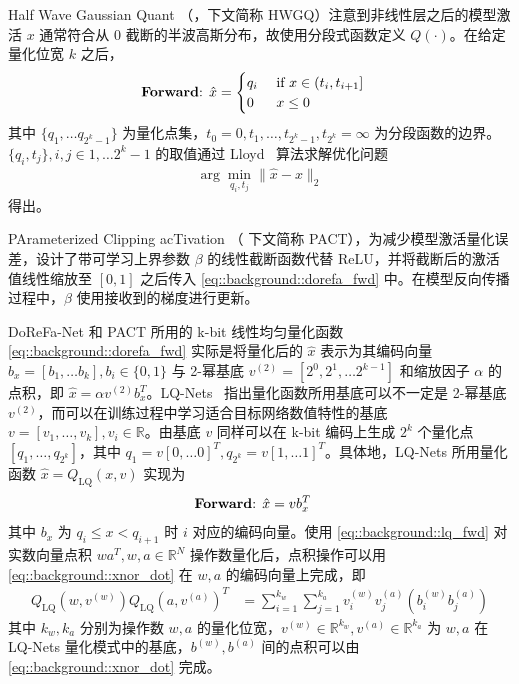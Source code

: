 Half Wave Gaussian Quant （\citet{cai2017deep}，下文简称 HWGQ）注意到非线性层之后的模型激活 $x$ 通常符合从 0 截断的半波高斯分布，故使用分段式函数定义 $Q(\cdot)$。在给定量化位宽 $k$ 之后，
\begin{align}
  \text{\textbf{Forward}: } & \hat{x} = 
    \begin{cases} 
      q_i & \text{ if } x \in (t_i, t_{i+1}] \\
      0 & \text{ } x \le 0
    \end{cases}
    \label{eq::background::hwgq}
\end{align}
其中 $\{q_1, \ldots q_{2^k-1}\}$ 为量化点集，$t_0=0, t_1, \ldots, t_{2^k-1}, t_{2^k}=\infty$ 为分段函数的边界。$\{q_i, t_j\}, i, j \in {1, \ldots 2^k-1}$ 的取值通过 Lloyd~\citep{lloyd1982least} 算法求解优化问题
\begin{align}
  \arg\min_{q_i, t_j} \|\hat{x} - x\|_2
\end{align}
得出。

PArameterized Clipping acTivation （\citet{choi2018pact} 下文简称 PACT），为减少模型激活量化误差，设计了带可学习上界参数 $\beta$ 的线性截断函数代替 ReLU，并将截断后的激活值线性缩放至 $[0, 1]$ 之后传入 \eqref{eq::background::dorefa_fwd} 中。在模型反向传播过程中，$\beta$ 使用接收到的梯度进行更新。 

DoReFa-Net 和 PACT 所用的 k-bit 线性均匀量化函数 \eqref{eq::background::dorefa_fwd} 实际是将量化后的 $\hat{x}$ 表示为其编码向量 $b_x = [b_1, \ldots b_k], b_i \in \{0, 1\}$ 与 2-幂基底 $v^{(2)} = [2^0, 2^1, \ldots 2^{k-1}]$ 和缩放因子 $\alpha$ 的点积，即 $\hat{x} = \alpha v^{(2)} b_x^T$。LQ-Nets~\citep{Zhang_2018} 指出量化函数所用基底可以不一定是 2-幂基底 $v^{(2)}$，而可以在训练过程中学习适合目标网络数值特性的基底 $v = [v_1, \ldots, v_k], v_i \in \mathbb{R}$。由基底 $v$ 同样可以在 k-bit 编码上生成 $2^k$ 个量化点 $[q_1, \ldots, q_{2^k}]$，其中 $q_1 = v [0, \ldots 0]^T, q_{2^k} = v [1, \ldots 1]^T$。具体地，LQ-Nets 所用量化函数 $\hat{x} = Q_{\mathrm{LQ}}(x, v)$ 实现为
\begin{align}
  \text{\textbf{Forward}: } & \hat{x} = v b_x^T \label{eq::background::lq_fwd}
\end{align}
其中 $b_x$ 为 $q_i \le x < q_{i+1}$ 时 $i$ 对应的编码向量。使用 \eqref{eq::background::lq_fwd} 对实数向量点积 $wa^T, w, a \in \mathbb{R}^N$ 操作数量化后，点积操作可以用 \eqref{eq::background::xnor_dot} 在 $w, a$ 的编码向量上完成，即
\begin{align}
  Q_{\mathrm{LQ}}(w, v^{(w)}) Q_{\mathrm{LQ}}(a, v^{(a)})^T &= \sum_{i=1}^{k_w} \sum_{j=1}^{k_a} v^{(w)}_i v^{(a)}_{j} (b^{(w)}_i b^{(a)}_j)
\end{align}
其中 $k_w, k_a$ 分别为操作数 $w, a$ 的量化位宽，$v^{(w)} \in \mathbb{R}^{k_w}, v^{(a)} \in \mathbb{R}^{k_a}$ 为 $w, a$ 在 LQ-Nets 量化模式中的基底，$b^{(w)}, b^{(a)}$ 间的点积可以由 \eqref{eq::background::xnor_dot} 完成。

